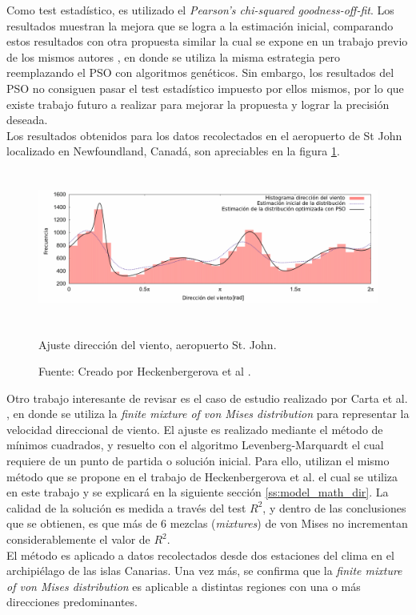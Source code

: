 Como test estadístico, es utilizado el \emph{Pearson's chi-squared goodness-off-fit}. Los resultados muestran la mejora que se logra a la estimación inicial, comparando estos resultados con otra propuesta similar la cual se expone en un trabajo previo de los mismos autores \cite{Heckenbergerova13}, en donde se utiliza la misma estrategia pero reemplazando el PSO con algoritmos genéticos. Sin embargo, los resultados del PSO no consiguen pasar el test estadístico impuesto por ellos mismos, por lo que existe trabajo futuro  a realizar para mejorar la propuesta y lograr la precisión deseada.\\
Los resultados obtenidos para los datos recolectados en el aeropuerto de St John localizado en Newfoundland, Canadá, son apreciables en la figura \ref{fig:dir_pso}.
\begin{figure}[h!]
    \centering    
    \includegraphics[height=50mm]{figures/dir_pso.png} 
    \caption{Ajuste dirección del viento, aeropuerto St. John.}
    \caption*{Fuente: Creado por Heckenbergerova et al \cite{Heckenbergerova15}.}
    \vspace{-.25cm} 
    \label{fig:dir_pso}
\end{figure}

Otro trabajo interesante de revisar es el caso de estudio realizado por Carta et al. \cite{Carta07}, en donde se utiliza la \emph{finite mixture of von Mises distribution} para representar la velocidad direccional de viento. El ajuste es realizado mediante el método de mínimos cuadrados, y resuelto con el algoritmo Levenberg-Marquardt \cite{Gavin16} el cual requiere de un punto de partida o solución inicial. Para ello, utilizan el mismo método que se propone en el trabajo de Heckenbergerova et al. \cite{Heckenbergerova13} el cual se utiliza en este trabajo y se explicará en la siguiente sección \ref{ss:model_math_dir}. La calidad de la solución es medida a través del test $R^2$, y dentro de las conclusiones que se obtienen, es que más de 6 mezclas (\emph{mixtures}) de von Mises no incrementan considerablemente el valor de $R^2$.\\
El método es aplicado a datos recolectados desde dos estaciones del clima en el archipiélago de las islas Canarias. Una vez más, se confirma que la \emph{finite mixture of von Mises distribution} es aplicable a distintas regiones con una o más direcciones predominantes. 

